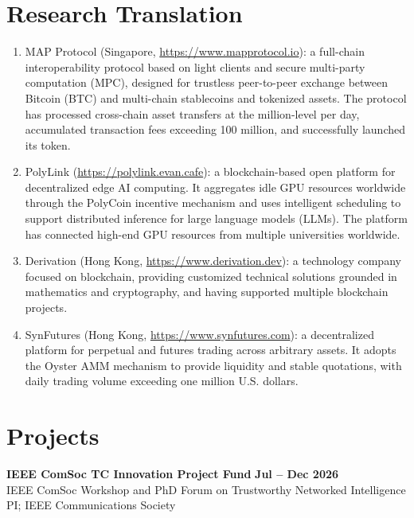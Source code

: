 \documentclass{resume}
\begin{document}
\section{Research Translation}
\begin{content}
    \begin{enumerate}
        \item MAP Protocol (Singapore, \url{https://www.mapprotocol.io}): a full-chain interoperability protocol based on light clients and secure multi-party computation (MPC), designed for trustless peer-to-peer exchange between Bitcoin (BTC) and multi-chain stablecoins and tokenized assets. The protocol has processed cross-chain asset transfers at the million-level per day, accumulated transaction fees exceeding 100 million, and successfully launched its token.
        \item PolyLink (\url{https://polylink.evan.cafe}): a blockchain-based open platform for decentralized edge AI computing. It aggregates idle GPU resources worldwide through the PolyCoin incentive mechanism and uses intelligent scheduling to support distributed inference for large language models (LLMs). The platform has connected high-end GPU resources from multiple universities worldwide.
        \item Derivation (Hong Kong, \url{https://www.derivation.dev}): a technology company focused on blockchain, providing customized technical solutions grounded in mathematics and cryptography, and having supported multiple blockchain projects.
        \item SynFutures (Hong Kong, \url{https://www.synfutures.com}): a decentralized platform for perpetual and futures trading across arbitrary assets. It adopts the Oyster AMM mechanism to provide liquidity and stable quotations, with daily trading volume exceeding one million U.S. dollars.
    \end{enumerate}
\sectionlineskip
\end{content}

\section{Projects}
\begin{content}
    {\bf IEEE ComSoc TC Innovation Project Fund} \hfill {\bf Jul -- Dec 2026} \\
    IEEE ComSoc Workshop and PhD Forum on Trustworthy Networked Intelligence \\
    PI; IEEE Communications Society
\sectionlineskip
\end{content}
\end{document}

